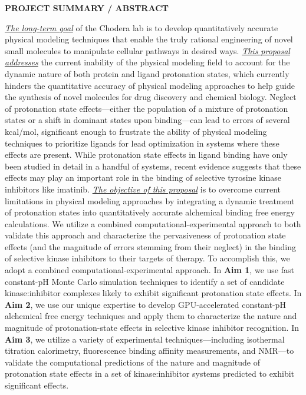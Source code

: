\documentclass[11pt]{article}
\begin{document}
\begin{centering}
{\bf PROJECT SUMMARY /  ABSTRACT}

\underline{\it The long-term goal} of the Chodera lab is to develop quantitatively accurate physical modeling techniques that enable the truly rational engineering of novel small molecules to manipulate cellular pathways in desired ways.
\underline{\it This proposal addresses} the current inability of the physical modeling field to account for the dynamic nature of both protein and ligand protonation states, which currently hinders the quantitative accuracy of physical modeling approaches to help guide the synthesis of novel molecules for drug discovery and chemical biology.
Neglect of protonation state effects---either the population of a mixture of protonation states or a shift in dominant states upon binding---can lead to errors of several kcal/mol, significant enough to frustrate the ability of physical modeling techniques to prioritize ligands for lead optimization in systems where these effects are present.
While protonation state effects in ligand binding have only been studied in detail in a handful of systems, recent evidence suggests that these effects may play an important role in the binding of selective tyrosine kinase inhibitors like imatinib.
\underline{\it The objective of this proposal} is to overcome current limitations in physical modeling approaches by integrating a dynamic treatment of protonation states into quantitatively accurate alchemical binding free energy calculations.
We utilize a combined computational-experimental approach to both validate this approach and characterize the pervasiveness of protonation state effects (and the magnitude of errors stemming from their neglect) in the binding of selective kinase inhibitors to their targets of therapy.
To accomplish this, we adopt a combined computational-experimental approach.
In {\bf Aim 1}, we use fast constant-pH Monte Carlo simulation techniques to identify a set of candidate kinase:inhibitor complexes likely to exhibit significant protonation state effects.
In {\bf Aim 2}, we use our unique expertise to develop GPU-accelerated constant-pH alchemical free energy techniques and apply them to characterize the nature and magnitude of protonation-state effects in selective kinase inhibitor recognition.
In {\bf Aim 3}, we utilize a variety of experimental techniques---including isothermal titration calorimetry, fluorescence binding affinity measurements, and NMR---to validate the computational predictions of the nature and magnitude of protonation state effects in a set of kinase:inhibitor systems predicted to exhibit significant effects.

\end{centering}
\end{document}

